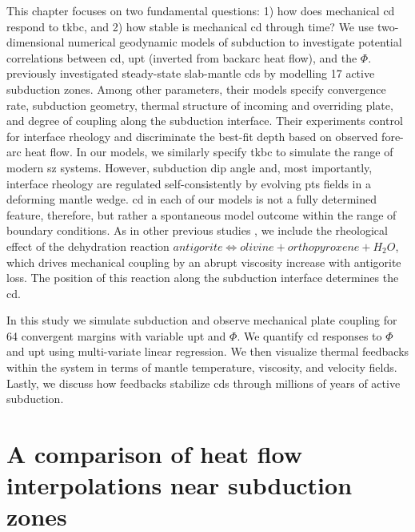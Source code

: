 This chapter focuses on two fundamental questions: 1) how does mechanical \gls{cd} respond to \gls{tkbc}, and 2) how stable is mechanical \gls{cd} through time? We use two-dimensional numerical geodynamic models of subduction to investigate potential correlations between \gls{cd}, \gls{upt} (inverted from backarc heat flow), and the \(\Phi\). \citet{Wada2009} previously investigated steady-state slab-mantle \glspl{cd} by modelling 17 active subduction zones. Among other parameters, their models specify convergence rate, subduction geometry, thermal structure of incoming and overriding plate, and degree of coupling along the subduction interface. Their experiments control for interface rheology and discriminate the best-fit depth based on observed fore-arc heat flow. In our models, we similarly specify \gls{tkbc} to simulate the range of modern \gls{sz} systems. However, subduction dip angle and, most importantly, interface rheology are regulated self-consistently by evolving \gls{pts} fields in a deforming mantle wedge. \gls{cd} in each of our models is not a fully determined feature, therefore, but rather a spontaneous model outcome within the range of boundary conditions. As in other previous studies \citep[e.g.,][]{Ruh2015}, we include the rheological effect of the dehydration reaction \(antigorite \allowbreak \Leftrightarrow olivine + orthopyroxene + H_{2}O\), which drives mechanical coupling by an abrupt viscosity increase with antigorite loss. The position of this reaction along the subduction interface determines the \gls{cd}.

In this study we simulate subduction and observe mechanical plate coupling for 64 convergent margins with variable \gls{upt} and \(\Phi\). We quantify \gls{cd} responses to \(\Phi\) and \gls{upt} using multi-variate linear regression. We then visualize thermal feedbacks within the system in terms of mantle temperature, viscosity, and velocity fields. Lastly, we discuss how feedbacks stabilize \glspl{cd} through millions of years of active subduction.

\cleardoublepage

\hypertarget{a-comparison-of-heat-flow-interpolations-near-subduction-zones}{%
\chapter{A comparison of heat flow interpolations near subduction zones}\label{a-comparison-of-heat-flow-interpolations-near-subduction-zones}}


